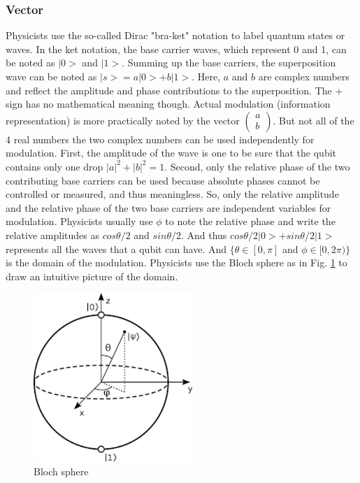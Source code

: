 \documentclass{book}
\begin{document}
\subsubsection{Vector}
Physicists use the so-called Dirac "bra-ket" notation to label quantum states or waves. In the ket notation, the base carrier waves, which represent 0 and 1, can be noted as $|0>$ and $|1>$. Summing up the base carriers, the superposition wave can be noted as $|s> = a |0> + b |1>$. Here, $a$ and $b$ are complex numbers and reflect the amplitude and phase contributions to the superposition. The $+$ sign has no mathematical meaning though. Actual modulation (information representation) is more practically noted by the vector $
\begin{pmatrix}
    a \\
    b
\end{pmatrix}.$
But not all of the 4 real numbers the two complex numbers can be used independently for modulation. First, the amplitude of the wave is one to be sure that the qubit contains only one drop $|a|^2 + |b|^2 = 1$. Second, only the relative phase of the two contributing base carriers can be used because absolute phases cannot be controlled or measured, and thus meaningless. So, only the relative amplitude and the relative phase of the two base carriers are independent variables for modulation. Physicists usually use $\phi$ to note the relative phase and write the relative amplitudes as $cos\theta/2$ and $sin\theta/2$. And thus $cos\theta/2 |0> + sin\theta/2 |1>$ represents all the waves that a qubit can have. And $\{\theta \in [0, \pi]$ and $\phi \in [0, 2\pi)\}$ is the domain of the modulation. Physicists use the Bloch sphere as in Fig. \ref{Bloch} to draw an intuitive picture of the domain.

\begin{figure}[ht]
\includegraphics[width=6cm]{pic/blochSphere.png}
\caption{Bloch sphere}
\label{Bloch}
\end{figure}
\end{document}
